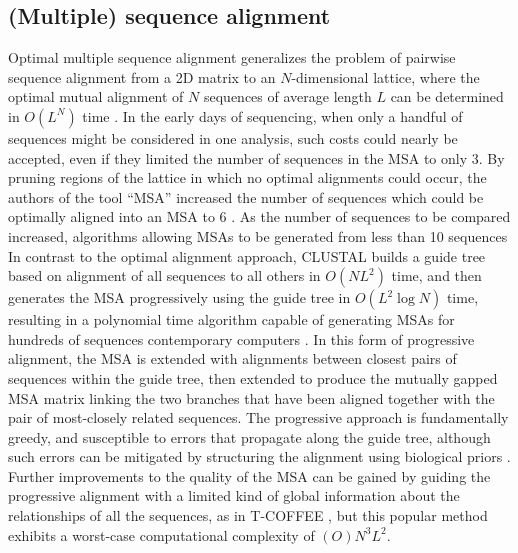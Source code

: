 \subsection{(Multiple) sequence alignment}
\label{sec:MSA}

Optimal multiple sequence alignment generalizes the problem of pairwise sequence alignment from a 2D matrix to an $N$-dimensional lattice, where the optimal mutual alignment of $N$ sequences of average length $L$ can be determined in $O(L^{N})$ time \cite{carrillo1988multiple}.
In the early days of sequencing, when only a handful of sequences might be considered in one analysis, such costs could nearly be accepted, even if they limited the number of sequences in the MSA to only 3.
By pruning regions of the lattice in which no optimal alignments could occur, the authors of the tool ``MSA'' increased the number of sequences which could be optimally aligned into an MSA to 6 \cite{lipman1989tool}.
As the number of sequences to be compared increased, algorithms allowing MSAs to be generated from less than 10 sequences
In contrast to the optimal alignment approach, CLUSTAL builds a guide tree based on alignment of all sequences to all others in $O(NL^{2})$ time, and then generates the MSA progressively using the guide tree in $O(L^{2}\log N)$ time, resulting in a polynomial time algorithm capable of generating MSAs for hundreds of sequences contemporary computers \cite{higgins1988clustal}.
In this form of progressive alignment, the MSA is extended with alignments between closest pairs of sequences within the guide tree, then extended to produce the mutually gapped MSA matrix linking the two branches that have been aligned together with the pair of most-closely related sequences.
The progressive approach is fundamentally greedy, and susceptible to errors that propagate along the guide tree, although such errors can be mitigated by structuring the alignment using biological priors \cite{thompson1994clustal}.
Further improvements to the quality of the MSA can be gained by guiding the progressive alignment with a limited kind of global information about the relationships of all the sequences, as in T-COFFEE \cite{notredame2000t}, but this popular method exhibits a worst-case computational complexity of $(O)N^{3}L^{2}$.

